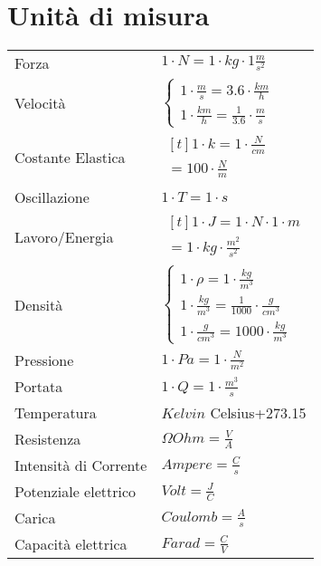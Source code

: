 \section{Unità di misura}

\begin{center}
  \begin{tabularx}{\textwidth}{ l l }
    Forza                 & $1 \cdot N = 1 \cdot kg \cdot 1 \frac{m}{s^2}$ \\
    Velocità              & $\begin{cases}
        1 \cdot \frac{m}{s} = 3.6 \cdot \frac{km}{h} \\
        1 \cdot \frac{km}{h} = \frac{1}{3.6} \cdot \frac{m}{s}
      \end{cases}$                    \\
    Costante Elastica     & $\!\begin{aligned}[t]1 \cdot k = 1 \cdot \frac{N}{cm} \\ = 100 \cdot \frac{N}{m}\end{aligned}$                  \\
    Oscillazione          & $1 \cdot T = 1 \cdot s$                        \\
    Lavoro/Energia        & $\!\begin{aligned}[t]1 \cdot J = 1 \cdot N \cdot 1 \cdot m \\ = 1 \cdot kg \cdot \frac{m^2}{s^2} \end{aligned}$                  \\
    Densità               & $\begin{cases}
        1 \cdot \rho = 1 \cdot \frac{kg}{m^3}                        \\
        1 \cdot \frac{kg}{m^3} = \frac{1}{1000} \cdot \frac{g}{cm^3} \\
        1 \cdot \frac{g}{cm^3} = 1000 \cdot \frac{kg}{m^3}
      \end{cases}$                    \\
    Pressione             & $1 \cdot Pa = 1 \cdot \frac{N}{m^2}$           \\
    Portata               & $1 \cdot Q = 1 \cdot \frac{m^3}{s}$            \\
    Temperatura           & $Kelvin$  {\tiny Celsius+273.15}               \\
    Resistenza            & $\Omega Ohm = \frac{V}{A}$                     \\
    Intensità di Corrente & $Ampere = \frac{C}{s}$                         \\
    Potenziale elettrico  & $Volt = \frac{J}{C}$                           \\
    Carica                & $Coulomb = \frac{A}{s}$                        \\
    Capacità elettrica    & $Farad = \frac{C}{V}$
  \end{tabularx}
\end{center}

